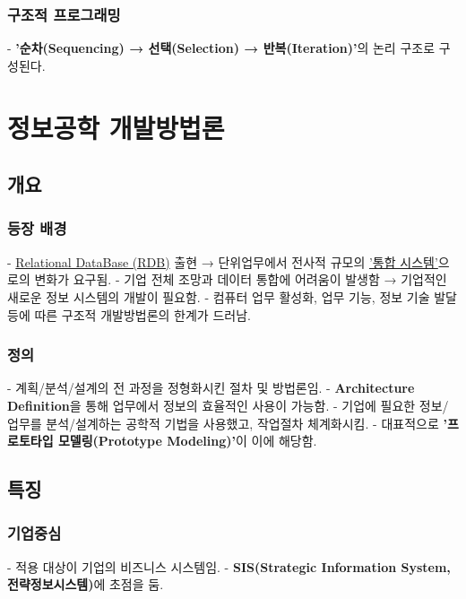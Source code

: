 \documentclass[a4paper,12pt]{article}
\begin{document}
\subsubsection{구조적 프로그래밍}
- \textbf{'순차(Sequencing) → 선택(Selection) → 반복(Iteration)'}의 논리 구조로 구성된다.

\newpage
\section{정보공학 개발방법론}

\subsection{개요}
\subsubsection{등장 배경}
- \underline{Relational DataBase (RDB)} 출현 → 단위업무에서 전사적 규모의 \underline{'통합 시스템'}으로의 변화가 요구됨.
\newline
- 기업 전체 조망과 데이터 통합에 어려움이 발생함 → 기업적인 새로운 정보 시스템의 개발이 필요함.
\newline
- 컴퓨터 업무 활성화, 업무 기능, 정보 기술 발달 등에 따른 구조적 개발방법론의 한계가 드러남.

\subsubsection{정의}
- 계획/분석/설계의 전 과정을 정형화시킨 절차 및 방법론임.
\newline
- \textbf{Architecture Definition}을 통해 업무에서 정보의 효율적인 사용이 가능함.
\newline
- 기업에 필요한 정보/업무를 분석/설계하는 공학적 기법을 사용했고, 작업절차 체계화시킴.
\newline
- 대표적으로 \textbf{'프로토타입 모델링(Prototype Modeling)'}이 이에 해당함.
\newline

\subsection{특징}
\subsubsection{기업중심}
- 적용 대상이 기업의 비즈니스 시스템임.
\newline
- \textbf{SIS(Strategic Information System, 전략정보시스템)}에 초점을 둠.
\end{document}
